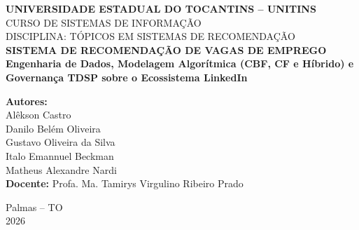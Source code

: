 \documentclass[12pt,a4paper]{article}
\begin{document}
\begin{titlepage}
    \centering
    \vspace*{0.5cm}
    {\large \textbf{UNIVERSIDADE ESTADUAL DO TOCANTINS -- UNITINS}}\\[0.3cm]
    {\large CURSO DE SISTEMAS DE INFORMAÇÃO}\\[0.3cm]
    {\large DISCIPLINA: TÓPICOS EM SISTEMAS DE RECOMENDAÇÃO}\\[3.0cm]

    {\Large \textbf{SISTEMA DE RECOMENDAÇÃO DE VAGAS DE EMPREGO}}\\[0.4cm]
    {\large \textbf{Engenharia de Dados, Modelagem Algorítmica (CBF, CF e Híbrido) e Governança TDSP sobre o Ecossistema LinkedIn}}\\[3.0cm]

    \begin{flushright}
        \textbf{Autores:}\\
        Alêkson Castro\\
        Danilo Belém Oliveira\\
        Gustavo Oliveira da Silva\\
        Italo Emannuel Beckman\\
        Matheus Alexandre Nardi\\[0.4cm]
        \textbf{Docente:} Profa. Ma. Tamirys Virgulino Ribeiro Prado
    \end{flushright}

    \vfill
    {\large Palmas -- TO}\\
    {\large 2026}
\end{titlepage}

\tableofcontents
\newpage



\newpage


\newpage


\newpage


\newpage


\newpage


\end{document}
